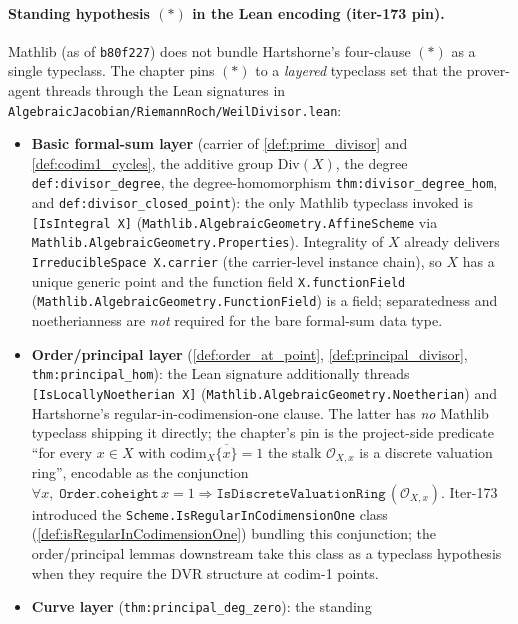 \paragraph{Standing hypothesis \((*)\) in the Lean encoding (iter-173 pin).}
Mathlib (as of \texttt{b80f227}) does not bundle Hartshorne's four-clause
\((\ast)\) as a single typeclass. The chapter pins \((*)\) to a \emph{layered}
typeclass set that the prover-agent threads through the Lean signatures in
\texttt{AlgebraicJacobian/RiemannRoch/WeilDivisor.lean}:
\begin{itemize}
  \item \textbf{Basic formal-sum layer} (carrier of \ref{def:prime_divisor} and
    \ref{def:codim1_cycles}, the additive group \(\mathrm{Div}(X)\), the degree
    \texttt{def:divisor_degree}, the degree-homomorphism
    \texttt{thm:divisor_degree_hom}, and \texttt{def:divisor_closed_point}): the
    only Mathlib typeclass invoked is \texttt{[IsIntegral X]}
    (\texttt{Mathlib.AlgebraicGeometry.AffineScheme} via
    \texttt{Mathlib.AlgebraicGeometry.Properties}). Integrality of \(X\) already
    delivers \texttt{IrreducibleSpace X.carrier} (the carrier-level instance
    chain), so \(X\) has a unique generic point and the function field
    \texttt{X.functionField} (\texttt{Mathlib.AlgebraicGeometry.FunctionField})
    is a field; separatedness and noetherianness are \emph{not} required for
    the bare formal-sum data type.
  \item \textbf{Order/principal layer} (\ref{def:order_at_point},
    \ref{def:principal_divisor}, \texttt{thm:principal_hom}): the Lean
    signature additionally threads
    \texttt{[IsLocallyNoetherian X]}
    (\texttt{Mathlib.AlgebraicGeometry.Noetherian}) and Hartshorne's
    regular-in-codimension-one clause. The latter has \emph{no} Mathlib
    typeclass shipping it directly; the chapter's pin is the project-side
    predicate ``for every \(x \in X\) with \(\mathrm{codim}_X \overline{\{x\}} = 1\) the
    stalk \(\mathcal O_{X,x}\) is a discrete valuation ring'', encodable as
    the conjunction
    $\forall x,\; \texttt{Order.coheight}\,x = 1 \Rightarrow
    \texttt{IsDiscreteValuationRing}\,(\mathcal O_{X,x})$. Iter-173 introduced
    the \texttt{Scheme.IsRegularInCodimensionOne} class
    (\ref{def:isRegularInCodimensionOne}) bundling this conjunction;
    the order/principal lemmas downstream take this class as a typeclass
    hypothesis when they require the DVR structure at codim-1 points.
  \item \textbf{Curve layer} (\texttt{thm:principal_deg_zero}): the standing

\end{itemize}
